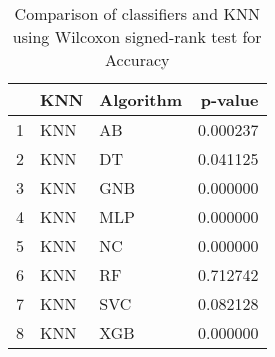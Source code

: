 \begin{table}
\footnotesize
\caption{Comparison of classifiers and KNN using Wilcoxon signed-rank test for Accuracy}
\label{tab:KNN wilcoxon Accuracy comparison}
\begin{tabular}{lllr}
\hline
 & KNN & Algorithm & p-value \\
\hline
1 & KNN & AB & 0.000237 \\
2 & KNN & DT & 0.041125 \\
3 & KNN & GNB & 0.000000 \\
4 & KNN & MLP & 0.000000 \\
5 & KNN & NC & 0.000000 \\
6 & KNN & RF & 0.712742 \\
7 & KNN & SVC & 0.082128 \\
8 & KNN & XGB & 0.000000 \\
\hline
\end{tabular}
\end{table}
